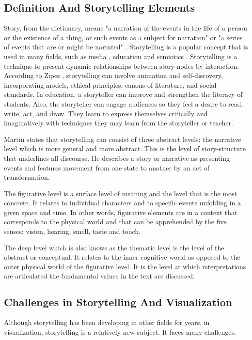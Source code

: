 \documentclass{egpubl}
\begin{document}
\subsection{Definition And Storytelling Elements}
Story, from the dictionary, means "a narration of the events in the life of a person or the existence of a thing, or such events as a subject for narration" \cite{story1} or "a series of events that are or might be narrated" \cite{story2}. Storytelling is a popular concept that is used in many fields, such as media \cite{segal}, education \cite{Jack1995} and semiotics \cite{Martin1997}.
Storytelling is a technique to present dynamic relationships between story nodes by interaction.
According to Zipes \cite{Jack1995}, storytelling can involve animation and self-discovery, incorporating models, ethical principles, canons of literature, and social standards. In education, a storyteller can improve and strengthen the literacy of students. Also, the storyteller can engage audiences so they feel a desire to read, write, act, and draw. They learn to express themselves critically and imaginatively with techniques they may learn from the storyteller or teacher.

Martin\cite{Martin1997} states that storytelling can consist of three abstract levels: the narrative level which is more general and more abstract. This is the level of story-structure that underlines all discourse. He describes a story or narrative as presenting events and features movement from one state to another by an act of transformation.

The figurative level is a surface level of meaning and the level that is the most concrete. It relates to individual characters and to specific events unfolding in a given space and time. In other words, figurative elements are in a context that corresponds to the physical world and that can be apprehended by the five senses: vision, hearing, smell, taste and touch.

The deep level which is also knows as the thematic level is the level of the abstract or conceptual. It relates to the inner cognitive world as opposed to the outer physical world of the figurative level. It is the level at which interpretations are articulated the fundamental values in the text are discussed.

\subsection{Challenges in Storytelling And Visualization}
Although storytelling has been developing in other fields for years, in visualization, storytelling is a relatively new subject. It faces many challenges.
\end{document}
